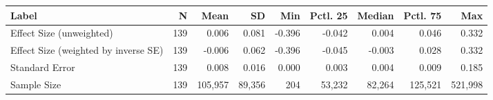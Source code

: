 \begin{tabular}{@{}l r r r r r r r r@{}}
\toprule
Label & N & Mean & SD & Min & Pctl. 25 & Median & Pctl. 75 & Max \\
\midrule
Effect Size (unweighted) & 139 & 0.006 & 0.081 & -0.396 & -0.042 & 0.004 & 0.046 & 0.332 \\
Effect Size (weighted by inverse SE) & 139 & -0.006 & 0.062 & -0.396 & -0.045 & -0.003 & 0.028 & 0.332 \\
Standard Error & 139 & 0.008 & 0.016 & 0.000 & 0.003 & 0.004 & 0.009 & 0.185 \\
Sample Size & 139 & 105,957 & 89,356 & 204 & 53,232 & 82,264 & 125,521 & 521,998 \\
\bottomrule
\end{tabular}